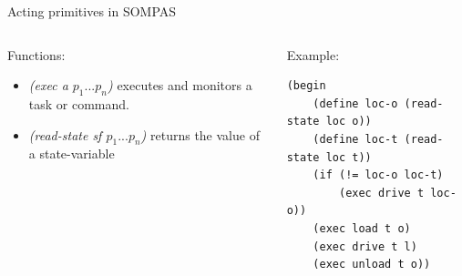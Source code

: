     
    
    

\begin{frame}[fragile]{Acting primitives in SOMPAS}
\begin{columns}
    \begin{column}{0.5\textwidth}
        Functions:
        \begin{itemize}
            \pause
                \item \textit{(exec a $p_1...p_n$)} executes and monitors a task or command.
            \pause
                \item \textit{(read-state sf $p_1...p_n$)} returns the value of a state-variable
            \end{itemize}
    \end{column}
\pause
    \begin{column}{0.5\textwidth}
           
    Example:
\small
    \lstset{columns=fullflexible}
    \begin{lstlisting}
(begin
    (define loc-o (read-state loc o))
    (define loc-t (read-state loc t))
    (if (!= loc-o loc-t)
        (exec drive t loc-o))
    (exec load t o) 
    (exec drive t l)
    (exec unload t o))             
    \end{lstlisting}
    \end{column}
\end{columns}
\end{frame}

